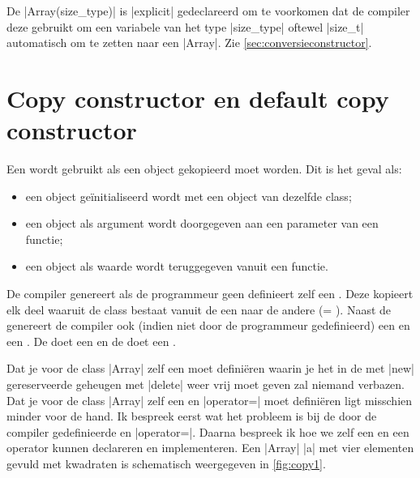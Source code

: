 \begin{cpplstShortInline}
De  |Array(size_type)| is |explicit| gedeclareerd om te voorkomen dat de compiler deze  gebruikt om een variabele van het type |size_type| oftewel |size_t| automatisch om te zetten naar een |Array|.
Zie \cref{sec:conversieconstructor}.

\section{Copy constructor en default copy constructor}
\label{copy constructor} 
Een  wordt gebruikt als een object gekopieerd moet worden.
Dit is het geval als:
\begin{itemize}
    \item een object geïnitialiseerd wordt met een object van dezelfde class;
    \item een object als argument wordt doorgegeven aan een  parameter van een functie;
    \item een object als waarde wordt teruggegeven vanuit een functie.
\end{itemize}
De compiler genereert als de programmeur geen  definieert zelf een .
Deze  kopieert elk deel waaruit de class bestaat vanuit de een naar de andere (= ).
Naast de  genereert de compiler ook (indien niet door de programmeur gedefinieerd) een  en een .
De  doet een  en de  doet een .

Dat je voor de class |Array| zelf een  moet
definiëren waarin je het in de  met |new| gereserveerde geheugen met |delete| weer vrij moet geven zal niemand verbazen.
Dat je voor de class |Array| zelf een  en |operator=| moet definiëren ligt misschien minder voor de hand.
Ik bespreek eerst wat het probleem is bij de door de compiler gedefinieerde  en |operator=|.
Daarna bespreek ik hoe we zelf een  en een operator kunnen declareren en implementeren.
Een |Array| |a| met vier elementen gevuld met kwadraten is schematisch weergegeven in \cref{fig:copy1}.



\end{cpplstShortInline}
